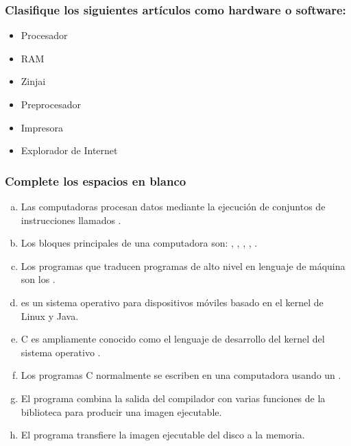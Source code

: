 \begin{ejercicioClase}

    \subsubsection{Clasifique los siguientes artículos como hardware o software:}
    \begin{itemize}
      \item Procesador
      \item RAM
      \item Zinjai
      \item Preprocesador
      \item Impresora
      \item Explorador de Internet
    \end{itemize}

    \subsubsection{Complete los espacios en blanco}
    \begin{enumerate}[a)]
      \item Las computadoras procesan datos mediante la ejecución de conjuntos de instrucciones llamados \underspace.
      \item Los bloques principales de una computadora son: \underspace, \underspace, \underspace, \underspace, \underspace.
      \item Los programas que traducen programas de alto nivel en lenguaje de máquina son los \underspace.
      \item \underspace es un sistema operativo para dispositivos móviles basado en el kernel de Linux y Java.
      \item C es ampliamente conocido como el lenguaje de desarrollo del kernel del sistema operativo \underspace.
      \item Los programas C normalmente se escriben en una computadora usando un \underspace.
      \item El programa \underspace combina la salida del compilador con varias funciones de la biblioteca para producir una imagen ejecutable.
      \item El programa \underspace transfiere la imagen ejecutable del disco a la memoria.
    
    \end{enumerate}



\end{ejercicioClase}
